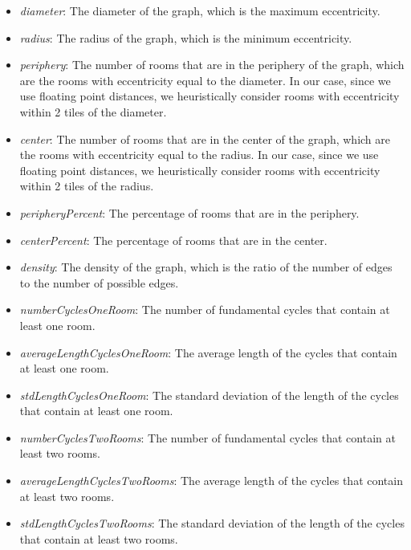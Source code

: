 \documentclass{Configuration_Files/PoliMi3i_thesis}
\begin{document}
\begin{itemize}
    \item \textit{diameter}: The diameter of the graph, which is the maximum eccentricity.
    \item \textit{radius}: The radius of the graph, which is the minimum eccentricity.
    \item \textit{periphery}: The number of rooms that are in the periphery of the graph, which are the rooms with eccentricity equal to the diameter. In our case, since we use floating point distances, we heuristically consider rooms with eccentricity within 2 tiles of the diameter.
    \item \textit{center}: The number of rooms that are in the center of the graph, which are the rooms with eccentricity equal to the radius. In our case, since we use floating point distances, we heuristically consider rooms with eccentricity within 2 tiles of the radius.
    \item \textit{peripheryPercent}: The percentage of rooms that are in the periphery.
    \item \textit{centerPercent}: The percentage of rooms that are in the center.
    \item \textit{density}: The density of the graph, which is the ratio of the number of edges to the number of possible edges.
    \item \textit{numberCyclesOneRoom}: The number of fundamental cycles that contain at least one room.
    \item \textit{averageLengthCyclesOneRoom}: The average length of the cycles that contain at least one room.
    \item \textit{stdLengthCyclesOneRoom}: The standard deviation of the length of the cycles that contain at least one room.
    \item \textit{numberCyclesTwoRooms}: The number of fundamental cycles that contain at least two rooms.
    \item \textit{averageLengthCyclesTwoRooms}:  The average length of the cycles that contain at least two rooms.
    \item \textit{stdLengthCyclesTwoRooms}: The standard deviation of the length of the cycles that contain at least two rooms.
\end{itemize}
\end{document}
